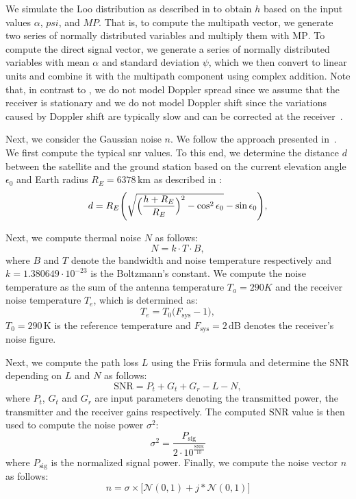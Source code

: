 \documentclass[conference]{IEEEtran}
\newcommand\MP{\ensuremath{\mathrm{MP}}\xspace}
\begin{document}
We simulate the Loo distribution as described in \cite{DBLP:journals/ijscn/Perez-FontanMMPMMR08} to obtain $h$ based on the input values $\alpha$, $psi$, and $MP$.
That is, to compute the multipath vector, we generate two series of normally distributed variables and multiply them with \MP.
To compute the direct signal vector, we generate a series of normally distributed variables with mean $\alpha$ and standard deviation $\psi$, which we then convert to linear units and combine it with the multipath component using complex addition.
Note that, in contrast to \cite{DBLP:journals/ijscn/Perez-FontanMMPMMR08}, we do not model Doppler spread since we assume that the receiver is stationary and we do not model Doppler shift since the variations caused by Doppler shift are typically slow and can be corrected at the receiver~\cite{DBLP:journals/ijscn/Perez-FontanMMPMMR08}. 

Next, we consider the Gaussian noise $n$. We follow the approach presented in~\cite{satjscc}. 
We first compute the typical \ac{snr} values. 
To this end, we determine the distance $d$ between the satellite and the ground station based on the current elevation angle $\epsilon_0$ and Earth radius $R_E = 6378\,\textrm{km}$ as described in \cite{7506756}:
%
\begin{equation}
  d = R_E\Biggl(\sqrt{\Bigl(\frac{h + R_E}{R_E}\Bigr)^2 - \cos^{2}\epsilon_{0}} - \sin\epsilon_{0}\Biggr),
\end{equation}
%

Next, we compute thermal noise $N$ as follows:
%
\begin{equation}
  N=k \cdot T \cdot B,
\end{equation}
%
where $B$ and $T$ denote the bandwidth and noise temperature respectively and $k = 1.380649 \cdot 10^{-23}$ is the Boltzmann's constant.
We compute the noise temperature as the sum of the antenna temperature $T_a = 290 K$ and the receiver noise temperature $T_e$, which is determined as:
%
\begin{equation}
  T_e = T_0 \big(F_{\mathrm{sys}} - 1 \big),
\end{equation}
%
$T_0 = 290$\,K is the reference temperature and $F_{\textrm{sys}} = 2$\,dB denotes the receiver's noise figure.

Next, we compute the path loss $L$ using the Friis formula and determine the SNR depending on $L$ and $N$ as follows:
%
\begin{equation}
  \mathrm{SNR} = P_t + G_t + G_r - L - N,
\end{equation}
%
where $P_t$, $G_t$ and $G_r$ are input parameters denoting the transmitted power, the transmitter and the receiver gains respectively. 
The computed $\mathrm{SNR}$ value is then used to compute the noise power $\sigma^2$:
%
\begin{equation}
  \sigma^2 = \frac{P_{\mathrm{sig}}}{2 \cdot 10^{\frac{\mathrm{SNR}}{10}}}
\end{equation}
%
where $P_{\mathrm{sig}}$ is the normalized signal power.
Finally, we compute the noise vector $n$ as follows:
%
\begin{equation}
  n = \sigma \times \bigl[\mathcal{N}(0,1) + j * \mathcal{N}(0,1) \bigr] 
\end{equation}
\end{document}
